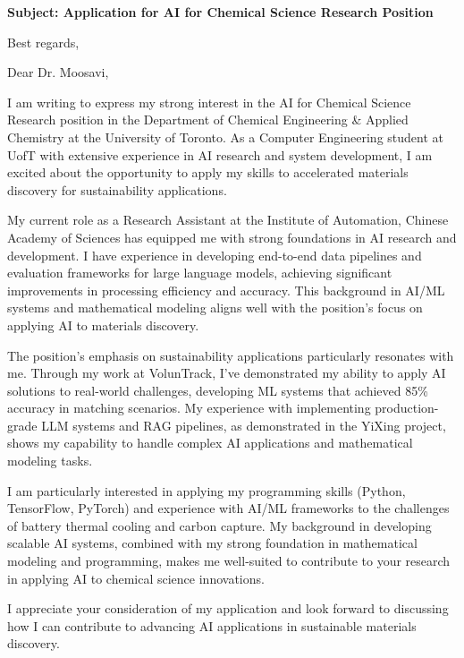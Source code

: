 \documentclass[11pt,a4paper,roman]{moderncv}
\begin{document}
\date{\today}
\opening{\textbf{Subject: Application for AI for Chemical Science Research Position}}
\closing{Best regards,}

\makelettertitle

Dear Dr. Moosavi,

I am writing to express my strong interest in the AI for Chemical Science Research position in the Department of Chemical Engineering \& Applied Chemistry at the University of Toronto. As a Computer Engineering student at UofT with extensive experience in AI research and system development, I am excited about the opportunity to apply my skills to accelerated materials discovery for sustainability applications.

My current role as a Research Assistant at the Institute of Automation, Chinese Academy of Sciences has equipped me with strong foundations in AI research and development. I have experience in developing end-to-end data pipelines and evaluation frameworks for large language models, achieving significant improvements in processing efficiency and accuracy. This background in AI/ML systems and mathematical modeling aligns well with the position's focus on applying AI to materials discovery.

The position's emphasis on sustainability applications particularly resonates with me. Through my work at VolunTrack, I've demonstrated my ability to apply AI solutions to real-world challenges, developing ML systems that achieved 85\% accuracy in matching scenarios. My experience with implementing production-grade LLM systems and RAG pipelines, as demonstrated in the YiXing project, shows my capability to handle complex AI applications and mathematical modeling tasks.

I am particularly interested in applying my programming skills (Python, TensorFlow, PyTorch) and experience with AI/ML frameworks to the challenges of battery thermal cooling and carbon capture. My background in developing scalable AI systems, combined with my strong foundation in mathematical modeling and programming, makes me well-suited to contribute to your research in applying AI to chemical science innovations.

I appreciate your consideration of my application and look forward to discussing how I can contribute to advancing AI applications in sustainable materials discovery.

\makeletterclosing
\end{document}
